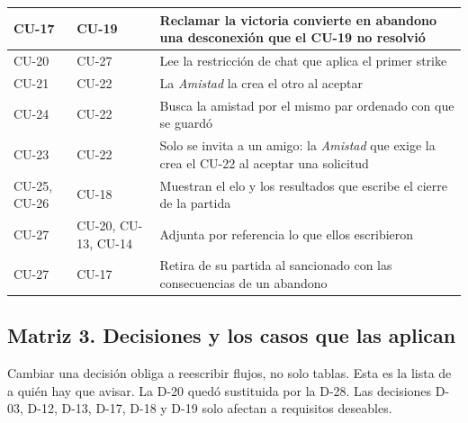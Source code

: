 \begin{center}
\begin{longtable}{|L{0.155\textwidth}|L{0.170\textwidth}|L{0.555\textwidth}|}
\mbox{CU-17} & \mbox{CU-19} & Reclamar la victoria convierte en abandono una desconexión que el \mbox{CU-19} no resolvió \\ \hline
\mbox{CU-20} & \mbox{CU-27} & Lee la restricción de chat que aplica el primer strike \\ \hline
\mbox{CU-21} & \mbox{CU-22} & La \textit{Amistad} la crea el otro al aceptar \\ \hline
\mbox{CU-24} & \mbox{CU-22} & Busca la amistad por el mismo par ordenado con que se guardó \\ \hline
\mbox{CU-23} & \mbox{CU-22} & Solo se invita a un amigo: la \textit{Amistad} que exige la crea el \mbox{CU-22} al aceptar una solicitud \\ \hline
\mbox{CU-25}, \mbox{CU-26} & \mbox{CU-18} & Muestran el elo y los resultados que escribe el cierre de la partida \\ \hline
\mbox{CU-27} & \mbox{CU-20}, \mbox{CU-13}, \mbox{CU-14} & Adjunta por referencia lo que ellos escribieron \\ \hline
\mbox{CU-27} & \mbox{CU-17} & Retira de su partida al sancionado con las consecuencias de un abandono \\ \hline
\end{longtable}
\end{center}

\subsection*{Matriz 3. Decisiones y los casos que las aplican}
Cambiar una decisión obliga a reescribir flujos, no solo tablas. Esta es la lista de a quién hay que avisar. La \mbox{D-20} quedó sustituida por la \mbox{D-28}. Las decisiones \mbox{D-03}, \mbox{D-12}, \mbox{D-13}, \mbox{D-17}, \mbox{D-18} y \mbox{D-19} solo afectan a requisitos deseables.

